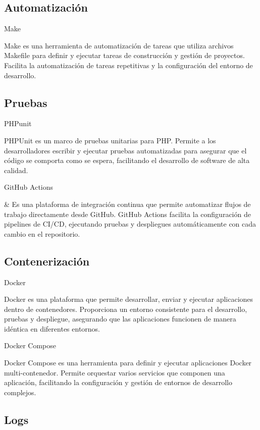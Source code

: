 \subsection{Automatización}

Make

Make es una herramienta de automatización de tareas que utiliza archivos
Makefile para definir y ejecutar tareas de construcción y gestión
de proyectos. Facilita la automatización de tareas repetitivas y la configuración del entorno de desarrollo.

\subsection{Pruebas}

PHPunit

PHPUnit es un marco de pruebas unitarias para PHP. Permite a los desarrolladores escribir y ejecutar pruebas
automatizadas
para asegurar que el código se comporta como se espera, facilitando el desarrollo de software de alta calidad.

GitHub Actions

& Es una plataforma de integración continua que
permite automatizar flujos de trabajo directamente desde GitHub. GitHub Actions
facilita la configuración de pipelines de CI/CD, ejecutando pruebas
y despliegues automáticamente con cada cambio en el repositorio.

\subsection{Contenerización}

Docker

Docker es una plataforma que permite desarrollar, enviar y ejecutar aplicaciones dentro de
contenedores. Proporciona un entorno consistente para el desarrollo, pruebas
y despliegue, asegurando que las aplicaciones funcionen de manera idéntica en diferentes entornos.

Docker Compose

Docker Compose es una herramienta para definir y ejecutar aplicaciones Docker multi-contenedor.
Permite orquestar varios servicios que componen una aplicación, facilitando
la configuración y gestión de entornos de desarrollo complejos.

\subsection{Logs}

